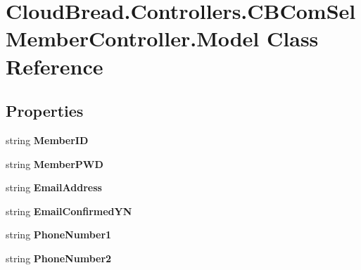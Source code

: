 \hypertarget{a00156}{}\section{Cloud\+Bread.\+Controllers.\+C\+B\+Com\+Sel\+Member\+Controller.\+Model Class Reference}
\label{a00156}
\subsection*{Properties}
\begin{DoxyCompactItemize}
\item 
string {\bfseries Member\+ID}\hypertarget{a00156_a1180dc7aee0e0296a8ca7ec89b018be9}{}\label{a00156_a1180dc7aee0e0296a8ca7ec89b018be9}

\item 
string {\bfseries Member\+P\+WD}\hypertarget{a00156_abf73cb850a3560393987adb0909da645}{}\label{a00156_abf73cb850a3560393987adb0909da645}

\item 
string {\bfseries Email\+Address}\hypertarget{a00156_ac22593ac90846284d67be452b19ffcc5}{}\label{a00156_ac22593ac90846284d67be452b19ffcc5}

\item 
string {\bfseries Email\+Confirmed\+YN}\hypertarget{a00156_acd1efb47c4d71a6cd435d5b27ee4c0b1}{}\label{a00156_acd1efb47c4d71a6cd435d5b27ee4c0b1}

\item 
string {\bfseries Phone\+Number1}\hypertarget{a00156_a2f85e9b46b5b1781628aa5a761d5b89b}{}\label{a00156_a2f85e9b46b5b1781628aa5a761d5b89b}

\item 
string {\bfseries Phone\+Number2}\hypertarget{a00156_aa9e6b892a65c0e0e61d401f20efa1867}{}\label{a00156_aa9e6b892a65c0e0e61d401f20efa1867}


\end{DoxyCompactItemize}
